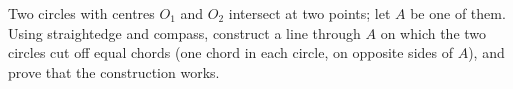 Two circles with centres $O_1$ and $O_2$ intersect at two points; let $A$ be one of them. Using straightedge and compass, construct a line through $A$ on which the two circles cut off equal chords (one chord in each circle, on opposite sides of $A$), and prove that the construction works.
